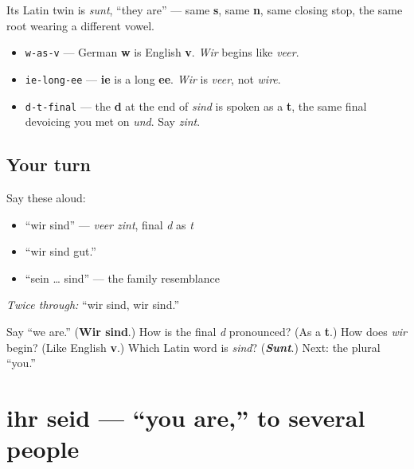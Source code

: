 Its Latin twin is \emph{sunt}, \textquotedblleft{}they are\textquotedblright{} — same \textbf{s}, same \textbf{n}, same closing stop, the same root wearing a different vowel.

\begin{sounds}
\begin{itemize}
\raggedright
  \item \texttt{w-as-v} — German \textbf{w} is English \textbf{v}. \emph{Wir} begins like \emph{veer}.
  \item \texttt{ie-long-ee} — \textbf{ie} is a long \textbf{ee}. \emph{Wir} is \emph{veer}, not \emph{wire}.
  \item \texttt{d-t-final} — the \textbf{d} at the end of \emph{sind} is spoken as a \textbf{t}, the same final devoicing you met on \emph{und}. Say \emph{zint}.
\end{itemize}
\end{sounds}

\subsection*{Your turn}
Say these aloud:

\begin{itemize}
\raggedright
  \item \textquotedblleft{}wir sind\textquotedblright{} — \emph{veer zint}, final \emph{d} as \emph{t}
  \item \textquotedblleft{}wir sind gut.\textquotedblright{}
  \item \textquotedblleft{}sein … sind\textquotedblright{} — the family resemblance
\end{itemize}

\emph{Twice through:} \textquotedblleft{}wir sind, wir sind.\textquotedblright{}

\begin{tcolorbox}[breakable,colback=teal!4,colframe=teal!35!black,title={Before you move on}]
Say \textquotedblleft{}we are.\textquotedblright{} (\textbf{Wir sind}.) How is the final \emph{d} pronounced? (As a \textbf{t}.) How does \emph{wir} begin? (Like English \textbf{v}.) Which Latin word is \emph{sind}? (\emph{\textbf{Sunt}}.) Next: the plural \textquotedblleft{}you.\textquotedblright{}
\end{tcolorbox}
\section[ihr seid]{ihr seid — \textquotedblleft{}you are,\textquotedblright{} to several people}

